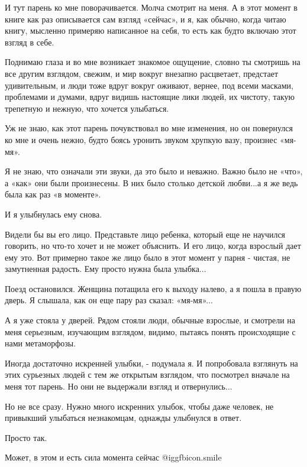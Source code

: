 И тут парень ко мне поворачивается. Молча смотрит на меня. А в этот момент в
книге как раз описывается сам взгляд «сейчас», и я, как обычно, когда читаю
книгу, мысленно примеряю написанное на себя, то есть как будто включаю этот
взгляд в себе. 

Поднимаю глаза и во мне возникает знакомое ощущение, словно ты смотришь на все
другим взглядом, свежим, и мир вокруг внезапно расцветает, предстает
удивительным, и люди тоже вдруг вокруг оживают, вернее, под всеми масками,
проблемами и думами, вдруг видишь настоящие лики людей, их чистоту, такую
трепетную и нежную, что хочется улыбаться. 

Уж не знаю, как этот парень почувствовал во мне изменения, но он повернулся ко
мне и очень нежно, будто боясь уронить звуком хрупкую вазу, произнес «мя-мя». 

Я не знаю, что означали эти звуки, да это было и неважно. Важно было не «что»,
а «как» они были произнесены. В них было столько детской любви...а я же ведь
была как раз «в моменте».

И я улыбнулась ему снова. 

Видели бы вы его лицо. Представьте лицо ребенка, который еще не научился
говорить, но что-то хочет и не может объяснить. И его лицо, когда взрослый дает
ему это. Вот примерно такое же лицо было в этот момент у парня - чистая, не
замутненная радость. Ему просто нужна была улыбка...

Поезд остановился. Женщина потащила его к выходу налево, а я пошла в правую
дверь. Я слышала, как он еще пару раз сказал: «мя-мя»...

А я уже стояла у дверей. Рядом стояли люди, обычные взрослые, и смотрели на
меня серьезным, изучающим взглядом, видимо, пытаясь понять происходящие с нами
метаморфозы. 

Иногда достаточно искренней улыбки, - подумала я. И попробовала взглянуть на
этих сурьезных людей с тем же открытым взглядом, что посмотрел вначале на меня
тот парень. Но они не выдержали взгляд и отвернулись...

Но не все сразу. Нужно много искренних улыбок, чтобы даже человек, не привыкший
улыбаться незнакомцам, однажды улыбнулся в ответ. 

Просто так. 

Может, в этом и есть сила момента сейчас  @igg{fbicon.smile} 

